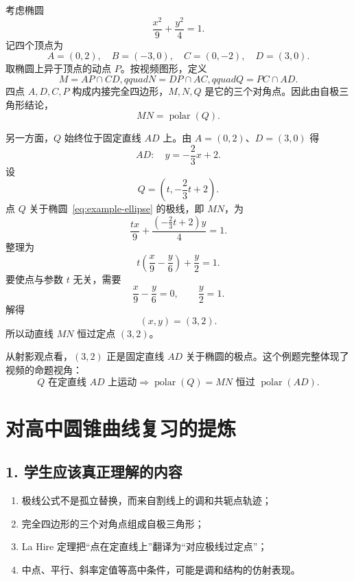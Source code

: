 \documentclass[UTF8,11pt]{ctexart}
\newcommand{\polar}{\operatorname{polar}}
\begin{document}
考虑椭圆
\begin{equation}
\label{eq:example-ellipse}
\frac{x^2}{9}+\frac{y^2}{4}=1.
\end{equation}
记四个顶点为
\[
A=(0,2),\quad B=(-3,0),\quad C=(0,-2),\quad D=(3,0).
\]
取椭圆上异于顶点的动点 $P$。按视频图形，定义
\[
M=AP\cap CD,qquad
N=DP\cap AC,qquad
Q=PC\cap AD.
\]
四点 $A,D,C,P$ 构成内接完全四边形，$M,N,Q$ 是它的三个对角点。因此由自极三角形结论，
\[
\boxed{MN=\polar(Q)}.
\]

另一方面，$Q$ 始终位于固定直线 $AD$ 上。由
$A=(0,2)$、$D=(3,0)$ 得
\begin{equation}
\label{eq:AD}
AD:\quad y=-\frac23x+2.
\end{equation}
设
\[
Q=\left(t,-\frac23t+2\right).
\]
点 $Q$ 关于椭圆~\eqref{eq:example-ellipse} 的极线，即 $MN$，为
\[
\frac{tx}{9}
+\frac{\left(-\frac23t+2\right)y}{4}=1.
\]
整理为
\begin{equation}
\label{eq:family-polar}
t\left(\frac{x}{9}-\frac{y}{6}\right)+\frac{y}{2}=1.
\end{equation}
要使点与参数 $t$ 无关，需要
\[
\frac{x}{9}-\frac{y}{6}=0,
\qquad
\frac{y}{2}=1.
\]
解得
\begin{equation}
\boxed{(x,y)=(3,2)}.
\end{equation}
所以动直线 $MN$ 恒过定点 $(3,2)$。

从射影观点看，$(3,2)$ 正是固定直线 $AD$ 关于椭圆的极点。这个例题完整体现了视频的命题视角：
\[
Q\text{ 在定直线 }AD\text{ 上运动}
\Longrightarrow
\polar(Q)=MN\text{ 恒过 }\polar(AD).
\]

\section{对高中圆锥曲线复习的提炼}

\subsection*{1. 学生应该真正理解的内容}

\begin{enumerate}
\item 极线公式不是孤立替换，而来自割线上的调和共轭点轨迹；
\item 完全四边形的三个对角点组成自极三角形；
\item La Hire 定理把“点在定直线上”翻译为“对应极线过定点”；
\item 中点、平行、斜率定值等高中条件，可能是调和结构的仿射表现。
\end{enumerate}
\end{document}
